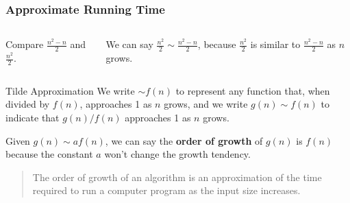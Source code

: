 \documentclass[aspectratio=169, 14pt]{beamer}
\begin{document}
\begin{frame}[fragile]
    \frametitle{Approximate Running Time}

    \begin{columns}
        Compare $\frac{n^2 - n}{2}$ and $\frac{n^2}{2}$.
        
        We can say \alert{$\frac{n^2}{2} \sim \frac{n^2 - n}{2}$}, because $\frac{n^2}{2}$ is similar to $\frac{n^2 - n}{2}$ as $n$ grows. 
    \end{columns}
\end{frame}

\begin{frame}[fragile]
\begin{exampleblock}{Tilde Approximation}
    We write $\sim f(n)$ to represent any function that, when divided by $f(n)$, approaches 1 as $n$ grows, and we write $g(n) \sim f(n)$ to indicate that $g(n)/f(n)$ approaches 1 as $n$ grows.
\end{exampleblock}    
\pause
Given $g(n)\sim af(n)$, we can say the \textbf{order of growth} of $g(n)$ is $f(n)$ because the constant $a$ won't change the growth tendency.
\end{frame}

\begin{frame}
   
    \begin{center}
    \end{center}


\begin{quote}
    The \alert{order of growth} of an algorithm is an approximation of the time required to run a computer program as the input size increases.
\end{quote}

\end{frame}
\end{document}
